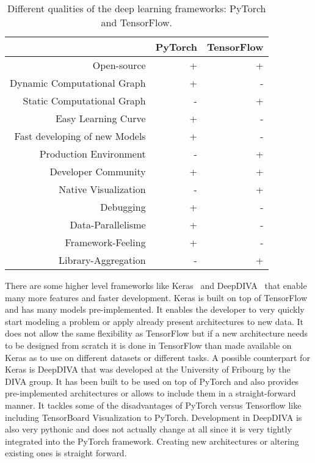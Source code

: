 \begin{table}[t] \centering
{}
\caption{Different qualities of the deep learning frameworks: PyTorch and TensorFlow.}
\begin{tabular}{@{}rrr@{}}
\toprule & PyTorch & TensorFlow \\
\midrule
Open-source									& + & + \\
Dynamic Computational Graph			& + & -  \\
Static Computational Graph				& - & +  \\
Easy Learning Curve							& + & -  \\
Fast developing of new Models			& + & -  \\
Production Environment					& - & + \\
Developer Community						& + & + \\
Native Visualization							& - & +  \\
Debugging										& + & -  \\
Data-Parallelisme								& + & -  \\
Framework-Feeling							& + & -  \\
Library-Aggregation							& - & +  \\
\bottomrule
\end{tabular}
\label{tbl:DeepLearningFrameworks}
\end{table}


There are some higher level frameworks like Keras~\cite{keras} and DeepDIVA~\cite{deepdiva} that enable many more features and faster development. Keras is built on top of TensorFlow and has many models pre-implemented. It enables the developer to very quickly start modeling a problem or apply already present architectures to new data. It does not allow the same flexibility as TensorFlow but if a new architecture needs to be designed from scratch it is done in TensorFlow than made available on Keras as to use on different datasets or different tasks. A possible counterpart for Keras is DeepDIVA that was developed at the University of Fribourg by the DIVA group. It has been built to be used on top of PyTorch and also provides pre-implemented architectures or allows to include them in a straight-forward manner. It tackles some of the disadvantages of PyTorch versus Tensorflow like including TensorBoard Visualization to PyTorch. Development in DeepDIVA is also very pythonic and does not actually change at all since it is very tightly integrated into the PyTorch framework. Creating new architectures or altering existing ones is straight forward.\\


